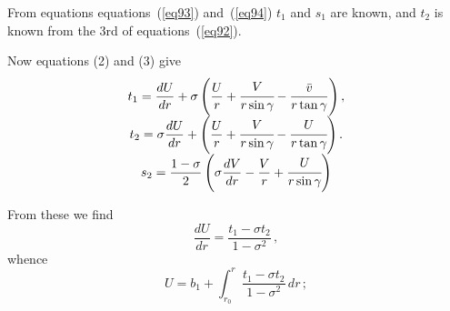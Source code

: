 From equations equations~(\ref{eq93}) and~(\ref{eq94})
\(t_1\) and
\(s_1\) are known, and
\(t_2\) is known from the 3rd of equations~(\ref{eq92}).

Now equations (2) and (3) give
\begin{equation}\label{eq95}
\begin{array}{c}
{{ t_{1}= {\displaystyle\frac{d U}{d r}}
+\sigma\left({\displaystyle\frac{U}{r}}+{\displaystyle\cfrac{V}{r\sin\gamma}}-{\displaystyle\frac{{\bar{v}}}{r\tan\gamma}}\right), }} \\
{ {\displaystyle t_{2}= \sigma{\displaystyle\frac{d U}{d r}}+
\left({\displaystyle\frac{U}{r}}+{\displaystyle\cfrac{V}{r\sin\gamma}}-{\displaystyle\cfrac{U}{r\tan\gamma}}\right).} } \\
{ 
{\displaystyle s_{2}= \frac{1-\sigma}{2} 
\left( \sigma {\displaystyle\frac{d V}{d r}}-
{\displaystyle\frac{V}{r}}+{\displaystyle\cfrac{U}{r\sin\gamma}} 
\right)
} }
\end{array}
\end{equation}

From these we find
\[ {\frac{d U}{d r}}={\frac{t_{1}-\sigma t_{2}}{1-\sigma^{2}}}\,, \]
whence
\begin{equation}\label{eq96}
U=b_{1}+\int_{r_{0}}^{r}\frac{t_{1}-\sigma t_{2}}{1-\sigma^{2}}\,d r\,;
\end{equation}
